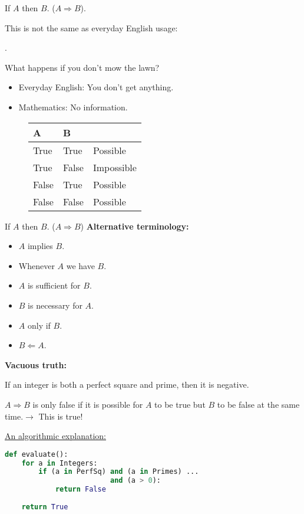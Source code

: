 \documentclass{beamer}
\begin{document}
\begin{frame}{If $A$ then $B$. ($A\Rightarrow B$).}
\begin{block}{}
\end{block}
This is not the same as everyday English usage:
\begin{block}{}
.
\end{block}
What happens if you don't mow the lawn?\pause
\begin{itemize}
\item Everyday English: You don't get anything.\pause
\item Mathematics: No information.
\end{itemize}
\begin{figure}
\centering
\begin{tabular}{| >{\centering\arraybackslash}b{1in} | >{\centering\arraybackslash}b{1in} || >{\centering\arraybackslash}b{1in}|}
\hline
A& B & \\
\hline
True & True & Possible\\
True & False& Impossible\\
False & True & Possible\\
False & False & Possible\\
\hline
\end{tabular}
\end{figure}

\end{frame}

\begin{frame}{If $A$ then $B$. ($A\Rightarrow B$)}
\textbf{Alternative terminology:}
\begin{itemize}
\item $A$ implies $B$.\pause
\item Whenever $A$ we have $B$.\pause
\item $A$ is sufficient for $B$.\pause
\item $B$ is necessary for $A$.\pause
\item $A$ only if $B$.\pause
\item $B\Leftarrow A$. 
\end{itemize}\pause

\end{frame}

\begin{frame}[fragile]
\textbf{Vacuous truth:}
\begin{block}{}
If an integer is both a perfect square and prime, then it is negative.
\end{block}
$A\Rightarrow B$ is only false if it is possible for $A$ to be true but $B$ to be false at the same time.$\rightarrow$ This is true!
\vspace{0.5cm}

\underline{An algorithmic explanation:}
\begin{lstlisting}[language=Python]
def evaluate():
    for a in Integers:
        if (a in PerfSq) and (a in Primes) ...
                         and (a > 0):
            return False		
	
    return True
\end{lstlisting}
\end{frame}
\end{document}
